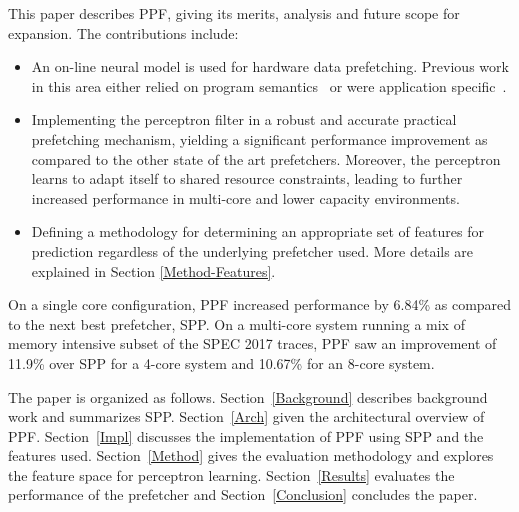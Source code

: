 \vspace{1ex}This paper describes PPF, giving its merits, analysis and
future scope for expansion.  The contributions include:

\begin{itemize}

\item An on-line neural model is used for hardware data
  prefetching.  Previous work in this area either relied on program
  semantics~\cite{Semantics} or were application specific~\cite{Datacenter}.

\item Implementing the perceptron filter in a robust and accurate
  practical prefetching mechanism, yielding a significant performance
  improvement as compared to the other state of the art prefetchers.
  Moreover, the perceptron learns to adapt itself to shared resource
  constraints, leading to further increased performance in multi-core and
  lower capacity environments.

\item Defining a methodology for determining an appropriate set of 
  features for prediction regardless of the underlying prefetcher used.
  More details are explained in Section \ref{Method-Features}.

\end{itemize}

On a single core configuration, PPF increased performance by 6.84\% as
compared to the next best prefetcher, SPP.  On a multi-core system running a
mix of memory intensive subset of the SPEC 2017 traces, PPF saw an improvement
of 11.9\% over SPP for a 4-core system and 10.67\% for an 8-core system.

The paper is organized as follows. Section~\ref{Background} describes
background work and summarizes SPP.  Section~\ref{Arch} given the 
architectural overview of PPF. Section~\ref{Impl} discusses the
implementation of PPF using SPP and the features used.
Section~\ref{Method} gives the evaluation methodology and explores the feature
space for perceptron learning.  Section~\ref{Results} evaluates the
performance of the prefetcher and Section~\ref{Conclusion} concludes the
paper.
